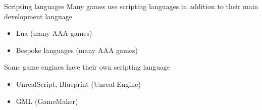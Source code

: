\begin{frame}{Scripting languages}
	\pause Many games use scripting languages in addition to their main development language
	\begin{itemize}
		\pause\item Lua (many AAA games)
		\pause\item Bespoke languages (many AAA games)
	\end{itemize}
	\pause Some game engines have their own scripting language
	\begin{itemize}
		\pause\item UnrealScript, Blueprint (Unreal Engine)
		\pause\item GML (GameMaker)
	\end{itemize}
\end{frame}

